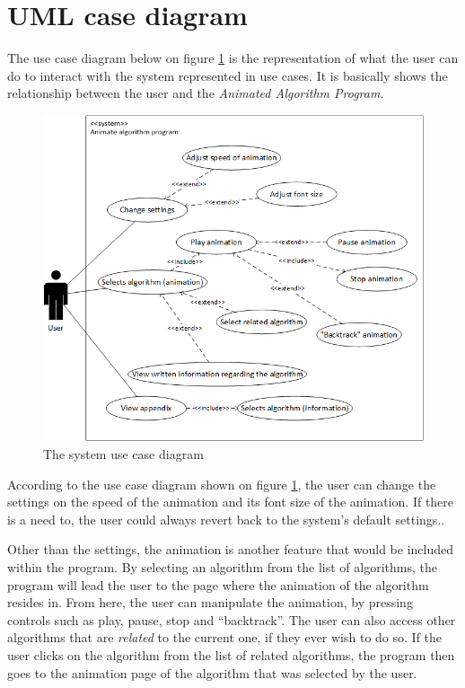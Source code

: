 \newpage

\section{UML case diagram}
The use case diagram below on figure \ref{useCaseDiagram} is the representation of what the user can do to interact with the system represented in use cases. It is basically shows the relationship between the user and the \textit{Animated Algorithm Program}.

\begin{figure}[H]
\centering
\hspace*{-1cm}
\includegraphics[scale=1]{images/report_images/useCaseDiagram.png}
\caption{The system use case diagram}
\label{useCaseDiagram}
\end{figure}

According to the use case diagram shown on figure \ref{useCaseDiagram}, the user can change the settings on the speed of the animation and its font size of the animation. If there is a need to, the user could always revert back to the system's default settings..

Other than the settings, the animation is another feature that would be included within the program. By selecting an algorithm from the list of algorithms, the program will lead the user to the page where the animation of the algorithm resides in. From here, the user can manipulate the animation, by pressing controls such as play, pause, stop and ``backtrack''. The user can also access other algorithms that are \textit{related} to the current one, if they ever wish to do so. If the user clicks on the algorithm from the list of related algorithms, the program then goes to the animation page of the algorithm that was selected by the user.

